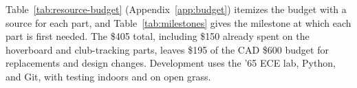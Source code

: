
\label{sec:resources}

Table~\ref{tab:resource-budget} (Appendix~\ref{app:budget}) itemizes the budget with a source for each part, and Table~\ref{tab:milestones} gives the milestone at which each part is first needed. The \$405 total, including \$150 already spent on the hoverboard and club-tracking parts, leaves \$195 of the CAD \$600 budget for replacements and design changes. Development uses the '65 ECE lab, Python, and Git, with testing indoors and on open grass.

\FloatBarrier
